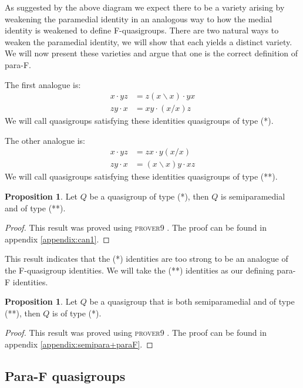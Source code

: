 \documentclass[12pt]{report}
\theoremstyle{definition}
\newtheorem{prp}[thm]{Proposition}
\newcommand{\ldv}{\backslash}       %
\newcommand{\rdv}{/}                %
\begin{document}
As suggested by the above diagram we expect there to be a variety arising by weakening the paramedial
  identity in an analogous way to how the medial identity is weakened to define F-quasigroups. There
  are two natural ways to weaken the paramedial identity, we will show that each yields a distinct
  variety. We will now present these varieties and argue that one is the correct definition of para-F.

The first analogue is:
\begin{align*}
  x\cdot yz &= z(x\ldv x)\cdot yx\\
  zy\cdot x &= xy\cdot (x\rdv x)z
\end{align*}
We will call quasigroups satisfying these identities quasigroups of type (*).

The other analogue is:
\begin{align*}
  x\cdot yz &= zx\cdot y(x\rdv x)\\
  zy\cdot x &= (x\ldv x)y\cdot xz
\end{align*}
We will call quasigroups satisfying these identities quasigroups of type (**).

\begin{prp}\label{can1}
  Let $Q$ be a quasigroup of type (*), then $Q$ is semiparamedial and of type (**). 
\end{prp}

\begin{proof}
  This result was proved using \textsc{prover9} \cite{Prover9}. The proof can be found in appendix \ref{appendix:can1}.
\end{proof}

This result indicates that the (*) identities are too strong to be an analogue of the F-quasigroup
  identities. We will take the (**) identities as our defining para-F identities.

\begin{prp}\label{semipara+paraF}
  Let $Q$ be a quasigroup that is both semiparamedial and of type (**), then $Q$ is of type (*).
\end{prp}

\begin{proof}
  This result was proved using \textsc{prover9} \cite{Prover9}. The proof can be found in
    appendix \ref{appendix:semipara+paraF}.
\end{proof}

\subsection{Para-F quasigroups}
\end{document}
